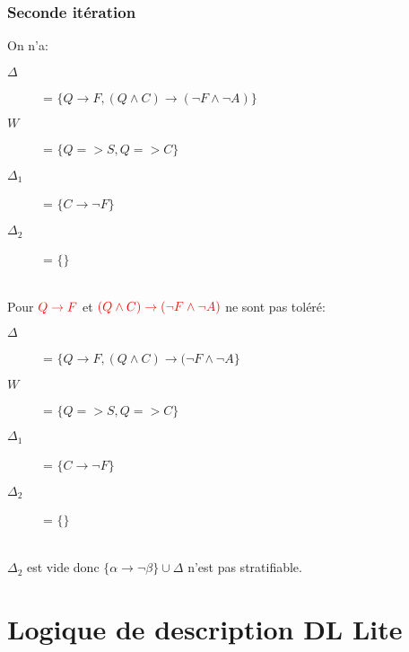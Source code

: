\subsection{Seconde itération}
On n'a:
\begin{description}
\item[$\Delta$] = $\{ Q \rightarrow F, (Q \wedge C) \rightarrow (\neg F \wedge \neg A) \}$
\item[$W$] = $\{ Q => S, Q => C\}$
\item[$\Delta_1$] = $\{ C \rightarrow \neg F \}$
\item[$\Delta_2$] = $\{ \}$
\end{description}
\ \\
Pour $\textcolor{red}{ Q \rightarrow F }$ et $\textcolor{red}{ ( Q \wedge C) \rightarrow (\neg F \wedge \neg A) }$ ne sont pas toléré:
\begin{description}
\item[$\Delta$] = $\{ Q \rightarrow F, (Q \wedge C) \rightarrow (\neg F \wedge \neg A \}$
\item[$W$] = $\{ Q => S, Q => C\}$
\item[$\Delta_1$] = $\{ C \rightarrow \neg F \}$
\item[$\Delta_2$] = $\{ \}$
\end{description}
\ \\
$\Delta_2$ est vide donc $\{\alpha \rightarrow \neg \beta \} \cup \Delta$ n'est pas stratifiable.

\chapter{Logique de description DL Lite}\pagebreak
